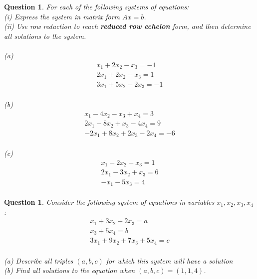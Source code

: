 \documentclass[12pt]{article}
\newtheorem{question}[thm]{Question}
\begin{document}
\begin{question}	\normalfont
	
For each of the following systems of equations: \\

\noindent (i) Express the system in matrix form $Ax =b$. \\

\noindent (ii) 	Use row reduction to reach {\bf reduced row echelon} form,
and then  determine all solutions to the
system.  \\ \\	
	
\noindent (a) 	
\[
\begin{array}{r}
x_1 + 2x_2 - x_3 = -1\\ 
2x_1 + 2x_2 + x_3 = 1 \\
3x_1 + 5x_2 - 2x_3 = -1 \\
\end{array}
\]

\vspace{.2cm}

\noindent (b)
\[
\begin{array}{r}
x_1 - 4x_2 - x_3 + x_4 = 3 \\
2x_1 - 8 x_2 + x_3 -4x_4 = 9 \\
-2x_1 + 8 x_2 + 2x_3 -2x_4 = -6 \\
\end{array}
\]	

\vspace{.2cm}

\noindent (c) 
\[
\begin{array}{r}
x_1 -2x_2 -x_3 = 1\\
2x_1 - 3x_2 + x_3 = 6 \\
-x_1 -5x_3 = 4 \\
\end{array}
\]


\end{question}
	
	
	\vspace{1cm}
	





\vspace{.5cm}

\begin{question}
	\normalfont
	
	Consider the following system of equations in variables $x_1,x_2,x_3,x_4$:
	\[
	\begin{array}{r}
	x_1 + 3x_2 + 2x_3 = a \\
	x_3 + 5 x_4 = b \\
	3x_1 + 9x_2 + 7x_3 + 5x_4 = c \\
	\end{array}
	\]
	
\noindent (a) Describe all triples $(a,b,c)$ for which this system will have a solution \\


\noindent (b) Find all solutions to the equation when  $(a,b,c)=(1,1,4)$. 
	
	
\end{question}
\end{document}
